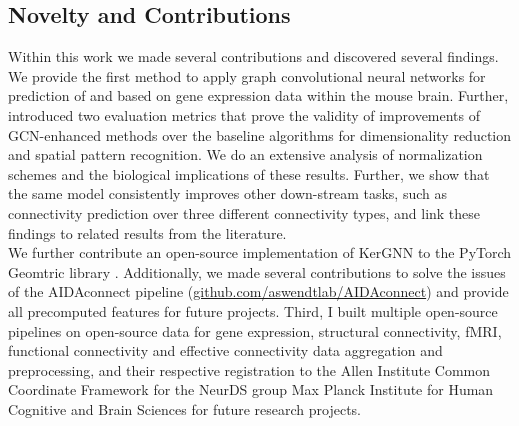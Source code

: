 \documentclass[]{article}
\renewcommand{\cite}{\citep}
\begin{document}
\subsection{Novelty and Contributions}
Within this work we made several contributions and discovered several findings. We provide the first method to apply graph convolutional neural networks for prediction of and based on gene expression data within the mouse brain. Further, introduced two evaluation metrics that prove the validity of improvements of GCN-enhanced methods over the baseline algorithms for dimensionality reduction and spatial pattern recognition. We do an extensive analysis of normalization schemes and the biological implications of these results. Further, we show that the same model consistently improves other down-stream tasks, such as connectivity prediction over three different connectivity types, and link these findings to related results from the literature.\\

We further contribute an open-source implementation of KerGNN \cite{feng2022kergnns} to the PyTorch Geomtric library \cite{PytorchGeometric}. Additionally, we made several contributions to solve the issues of the AIDAconnect pipeline (\href{https://github.com/aswendtlab/AIDAconnect}{github.com/aswendtlab/AIDAconnect}) and provide all precomputed features for future projects. Third, I built multiple open-source pipelines on open-source data for gene expression, structural connectivity, fMRI, functional connectivity and effective connectivity data aggregation and preprocessing, and their respective registration to the Allen Institute Common Coordinate Framework for the NeurDS group Max Planck Institute for Human Cognitive and Brain Sciences for future research projects.
\end{document}
